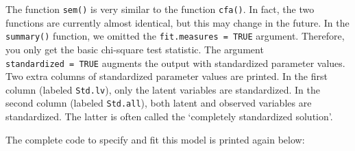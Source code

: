 The function \texttt{sem()} is very similar to the function
\texttt{cfa()}. In fact, the two functions are currently almost
identical, but this may change in the future. In the \texttt{summary()}
function, we omitted the \texttt{fit.measures\ =\ TRUE} argument.
Therefore, you only get the basic chi-square test statistic. The
argument \texttt{standardized\ =\ TRUE} augments the output with
standardized parameter values. Two extra columns of standardized
parameter values are printed. In the first column (labeled
\texttt{Std.lv}), only the latent variables are standardized. In the
second column (labeled \texttt{Std.all}), both latent and observed
variables are standardized. The latter is often called the `completely
standardized solution'.

The complete code to specify and fit this model is printed again below:

\begin{Shaded}
\begin{Highlighting}[]
\OtherTok{\textless{}{-}} \StringTok{\textquotesingle{}}
\StringTok{\textquotesingle{}}
\OtherTok{\textless{}{-}} 
\NormalTok{)}
\end{Highlighting}
\end{Shaded}

